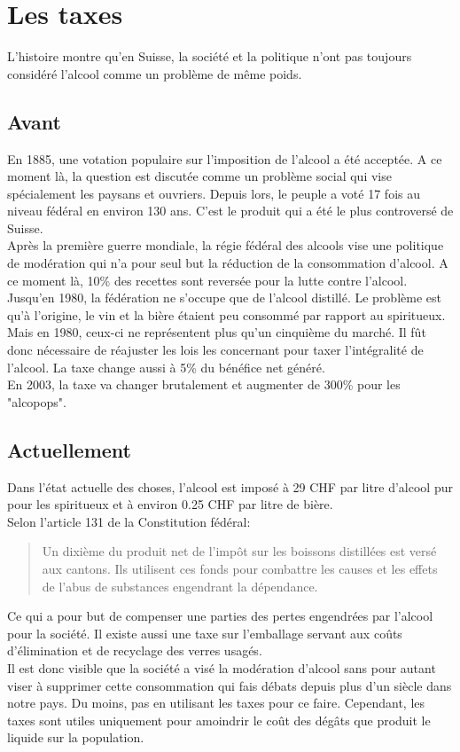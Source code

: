 \documentclass[a4paper, french, 12pt]{extarticle}
\begin{document}
	\section{Les taxes}
	L’histoire montre qu’en Suisse, la société et la politique n’ont pas toujours considéré l’alcool comme un problème de même poids.
	\subsection{Avant}
	En 1885, une votation populaire sur l'imposition de l'alcool a été acceptée. A ce moment là, la question est discutée comme un problème social qui vise spécialement les paysans et ouvriers. Depuis lors, le peuple a voté 17 fois au niveau fédéral en environ 130 ans. C'est le produit qui a été le plus controversé de Suisse.\\
	Après la première guerre mondiale, la régie fédéral des alcools vise une politique de modération qui n'a pour seul but la réduction de la consommation d'alcool. A ce moment là, 10\% des recettes sont reversée pour la lutte contre l'alcool.\\
	Jusqu'en 1980, la fédération ne s'occupe que de l'alcool distillé. Le problème est qu'à l'origine, le vin et la bière étaient peu consommé par rapport au spiritueux. Mais en 1980, ceux-ci ne représentent plus qu'un cinquième du marché. Il fût donc nécessaire de réajuster les lois les concernant pour taxer l'intégralité de l'alcool. La taxe change aussi à 5\% du bénéfice net généré.\\
	En 2003, la taxe va changer brutalement et augmenter de 300\% pour les "alcopops".
	\subsection{Actuellement}
	Dans l'état actuelle des choses, l'alcool est imposé à 29 CHF par litre d'alcool pur pour les spiritueux et à environ 0.25 CHF par litre de bière.\\
	Selon l'article 131 de la Constitution fédéral:
	\begin{quote}\begin{em}
		Un dixième du produit net de l'impôt sur les boissons distillées est versé aux cantons. Ils utilisent ces fonds pour combattre les causes et les effets de l'abus de substances engendrant la dépendance.
  \end{em}\end{quote}
  Ce qui a pour but de compenser une parties des pertes engendrées par l'alcool pour la société.
  Il existe aussi une taxe sur l'emballage servant aux coûts d'élimination et de recyclage des verres usagés.\\
  Il est donc visible que la société a visé la modération d'alcool sans pour autant viser à supprimer cette consommation qui fais débats depuis plus d'un siècle dans notre pays. Du moins, pas en utilisant les taxes pour ce faire. Cependant, les taxes sont utiles uniquement pour amoindrir le coût des dégâts que produit le liquide sur la population.
	
\end{document}
